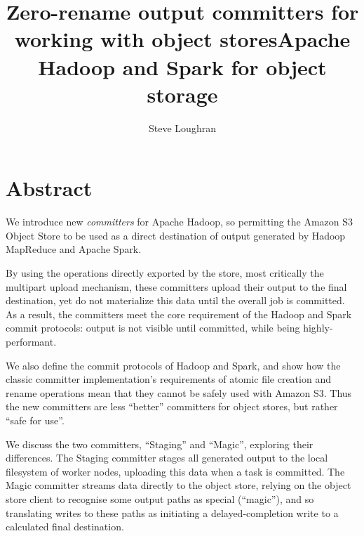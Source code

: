 \documentclass[9pt,technote]{IEEEtran}
\begin{document}
\parindent 0pt
\setlength{\parskip}{3ex}



\title{Zero-rename output committers for working with object storesApache Hadoop and Spark for object storage}
\author{Steve Loughran}
\maketitle


\section{Abstract}

We introduce new \emph{committers} for Apache Hadoop, so permitting
the Amazon S3 Object Store to be used as a direct destination of output generated
by Hadoop MapReduce and Apache Spark.

By using the operations directly exported by
the store, most critically the multipart upload mechanism, these committers upload
their output to the final destination, yet do not materialize this data until the
overall job is committed.
As a result, the committers meet the core requirement of the Hadoop and Spark commit
protocols: output is not visible until committed, while being highly-performant.

We also define the commit protocols of Hadoop and Spark, and show how the classic committer implementation's requirements of atomic file creation and rename operations mean that they cannot be safely used with Amazon S3.
Thus the new committers are less ``better'' committers for object stores, but rather ``safe for use''.

We discuss the two committers, ``Staging'' and ``Magic'', exploring their differences.
The Staging committer stages all generated output to the local filesystem of  worker nodes, uploading this data when a task is committed.
The Magic committer streams data directly to the object store, relying on the object store client to recognise some output paths as special (``magic''), and so translating writes to these paths as initiating a delayed-completion write to a calculated final destination.
\end{document}
